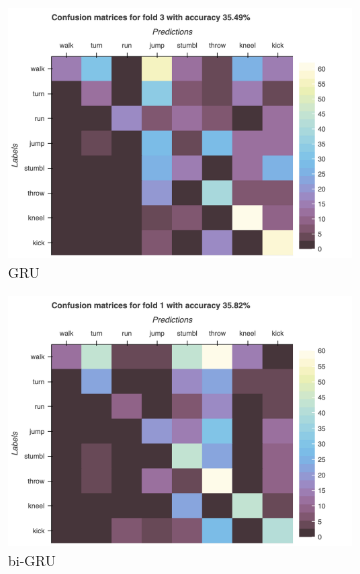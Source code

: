 		\begin{figure}[H]\ContinuedFloat
			\begin{subfigure}[b]{0.49\textwidth}
				\centering
				\includegraphics[width=\textwidth]{img/GRU-Confusion_matrix_drop.png}
				\caption{GRU}
			\end{subfigure}
			\hfill
			\begin{subfigure}[b]{0.49\textwidth}
				\centering
				\includegraphics[width=\textwidth]{img/bi-GRU-Confusion_matrix_drop.png}
				\caption{bi-GRU}
			\end{subfigure}
			\begin{subfigure}[b]{0.49\textwidth}
				\centering

\end{subfigure}
\end{figure}
